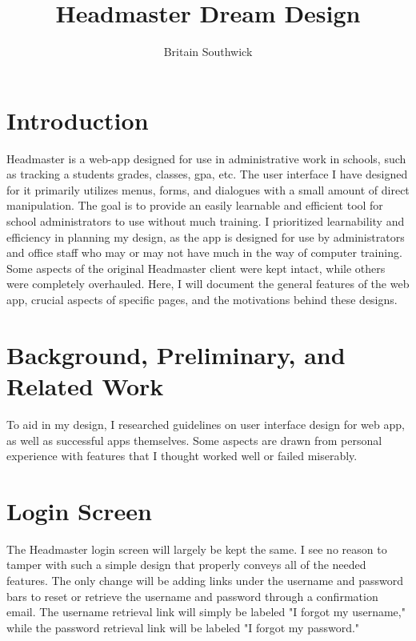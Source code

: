 \documentclass{article}
\title{Headmaster Dream Design}
\author{Britain Southwick}
\date{}
\begin{document}
\maketitle


\pagebreak
\tableofcontents

\pagebreak
\section{Introduction}
\label{Introduction}

Headmaster is a web-app designed for use in administrative work in schools, such as tracking a students grades, classes, gpa, etc. The user interface I have designed for it primarily utilizes menus, forms, and dialogues with a small amount of direct manipulation. The goal is to provide an easily learnable and efficient tool for school administrators to use without much training. I prioritized learnability and efficiency in planning my design, as the app is designed for use by administrators and office staff who may or may not have much in the way of computer training. Some aspects of the original Headmaster client were kept intact, while others were completely overhauled. Here, I will document the general features of the web app, crucial aspects of specific pages, and the motivations behind these designs.

\section{Background, Preliminary, and Related Work}

To aid in my design, I researched guidelines on user interface design for web app, as well as successful apps themselves. Some aspects are drawn from personal experience with features that I thought worked well or failed miserably. 

\section{Login Screen}

The Headmaster login screen will largely be kept the same. I see no reason to tamper with such a simple design that properly conveys all of the needed features. The only change will be adding links under the username and password bars to reset or retrieve the username and password through a confirmation email. The username retrieval link will simply be labeled "I forgot my username," while the password retrieval link will be labeled "I forgot my password."
\end{document}
